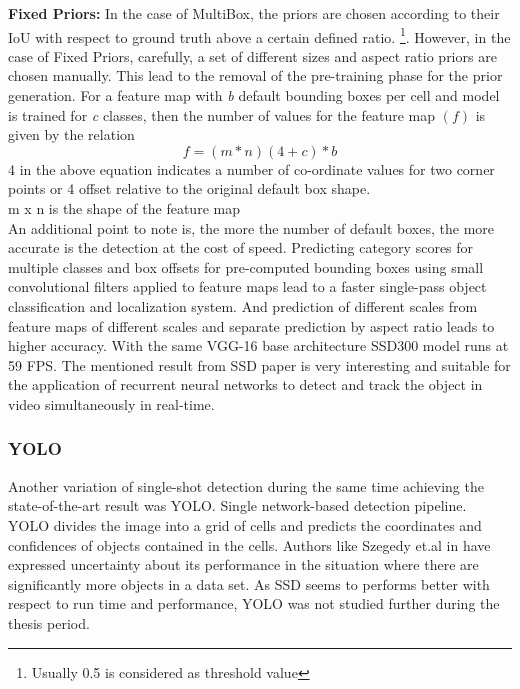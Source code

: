\textbf{Fixed Priors:} In the case of MultiBox, the priors are chosen according to their IoU with respect to ground truth above a certain defined ratio. \footnote{Usually 0.5 is considered as threshold value}.
However, in the case of Fixed Priors, carefully, a set of different sizes and aspect ratio priors are chosen manually. This lead to the removal of the pre-training phase for the prior generation. For a feature map with \textit{b} default bounding boxes per cell and model is trained for \textit{c} classes, then the number of values for the feature map $(f)$ is given by the relation 
\begin{equation}
	f = (m * n )  (4 + c) * b
\end {equation}
4 in the above equation indicates a number of co-ordinate values for two corner points or 4 offset relative to the original default box shape. \\
m x n is the shape of the feature map \\
 An additional point to note is, the more the number of default boxes, the more accurate is the detection at the cost of speed. Predicting category scores for multiple classes and box offsets for pre-computed bounding boxes using small convolutional filters applied to feature maps lead to a faster single-pass object classification and localization system. And prediction of different scales from feature maps of different scales and separate prediction by aspect ratio leads to higher accuracy. \cite{liu2016ssd} With the same VGG-16 base architecture SSD300 model runs at 59 FPS. The mentioned result from SSD paper is very interesting and suitable for the application of recurrent neural networks to detect and track the object in video simultaneously in real-time.

\subsubsection{YOLO}
Another variation of single-shot detection during the same time achieving the state-of-the-art result was YOLO. Single network-based detection pipeline. YOLO divides the image into a grid of cells and predicts the coordinates and confidences of objects contained in the cells. Authors like Szegedy et.al in \cite{szegedy2014scalable} have expressed uncertainty about its performance in the situation where there are significantly more objects in a data set. As SSD seems to performs better with respect to run time and performance, YOLO was not studied further during the thesis period.

